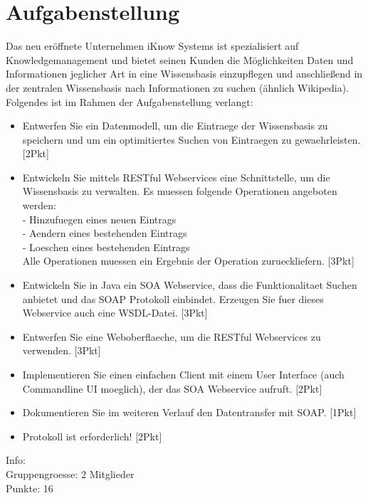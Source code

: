 \documentclass[letterpaper, 12pt]{article}
\let\tempsection\section
\renewcommand\section[1]{\vspace{-0.3cm}\tempsection{#1}\vspace{-0.3cm}}
\begin{document}
\parindent 0pt
\parskip 6pt



\clearpage
\thispagestyle{empty}
\tableofcontents

\newpage
{}
\pagestyle{fancy}

\section{Aufgabenstellung}
Das neu eröffnete Unternehmen iKnow Systems ist spezialisiert auf Knowledgemanagement und bietet seinen Kunden die Möglichkeiten Daten und Informationen jeglicher Art in eine Wissensbasis einzupflegen und anschließend in der zentralen Wissensbasis nach Informationen zu suchen (ähnlich Wikipedia). \\
Folgendes ist im Rahmen der Aufgabenstellung verlangt:
\begin{itemize}
	\item Entwerfen Sie ein Datenmodell, um die Eintraege der Wissensbasis zu speichern und um ein optimitiertes Suchen von Eintraegen zu gewaehrleisten. [2Pkt]
	\item Entwickeln Sie mittels RESTful Webservices eine Schnittstelle, um die Wissensbasis zu verwalten. Es muessen folgende Operationen angeboten werden: \\
	- Hinzufuegen eines neuen Eintrags \\
	- Aendern eines bestehenden Eintrags \\
	- Loeschen eines bestehenden Eintrags \\
	Alle Operationen muessen ein Ergebnis der Operation zurueckliefern. [3Pkt]
	\item Entwickeln Sie in Java ein SOA Webservice, dass die Funktionalitaet Suchen anbietet und das SOAP Protokoll einbindet. Erzeugen Sie fuer dieses Webservice auch eine WSDL-Datei. [3Pkt]
	\item Entwerfen Sie eine Weboberflaeche, um die RESTful Webservices zu verwenden. [3Pkt]
	\item Implementieren Sie einen einfachen Client mit einem User Interface (auch Commandline UI moeglich), der das SOA Webservice aufruft. [2Pkt] \\
	\item Dokumentieren Sie im weiteren Verlauf den Datentransfer mit SOAP. [1Pkt] \\
	\item Protokoll ist erforderlich! [2Pkt] \\
\end{itemize}
Info: \\
Gruppengroesse: 2 Mitglieder \\
Punkte: 16 \\
\end{document}
